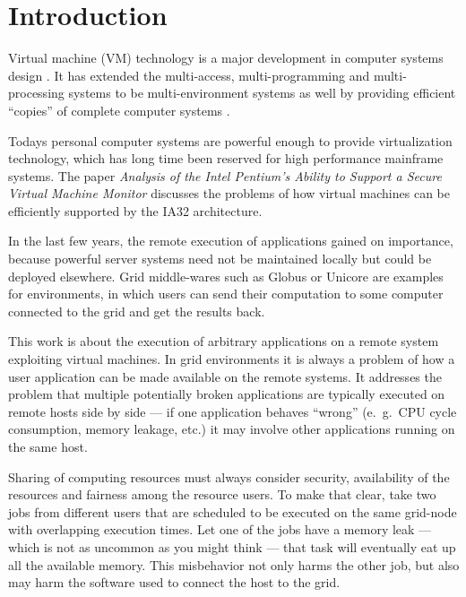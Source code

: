 
\chapter{Introduction}
\label{cha:intro}

Virtual machine (VM) technology is a major development in computer systems
design    \cite{buzen73}.     It    has   extended    the    multi-access,
multi-programming  and multi-processing  systems  to be  multi-environment
systems  as well by  providing efficient  ``copies'' of  complete computer
systems \cite{goldberg73}.

Todays  personal   computer  systems   are  powerful  enough   to  provide
virtualization  technology, which  has long  time been  reserved  for high
performance  mainframe  systems. The  paper  \emph{Analysis  of the  Intel
  Pentium's    Ability    to   Support    a    Secure   Virtual    Machine
  Monitor}\cite{robin00analysis}  discusses the  problems  of how  virtual
machines can be efficiently supported by the IA32 architecture.

In  the last few  years, the  remote execution  of applications  gained on
importance, because powerful server systems need not be maintained locally
but  could be  deployed elsewhere.  Grid  middle-wares such  as Globus  or
Unicore  are examples  for environments,  in  which users  can send  their
computation to  some computer  connected to the  grid and get  the results
back.

This work  is about  the execution of  arbitrary applications on  a remote
system exploiting  virtual machines. In  grid environments it is  always a
problem of  how a  user application  can be made  available on  the remote
systems.  It  addresses  the  problem  that  multiple  potentially  broken
applications are  typically executed on remote  hosts side by  side --- if
one  application behaves  ``wrong'' (e.~g.~CPU  cycle  consumption, memory
leakage,  etc.)  it  may involve  other applications  running on  the same
host.

Sharing of computing resources must always consider security, availability
of  the resources and  fairness among  the resource  users.  To  make that
clear,  take  two jobs  from  different users  that  are  scheduled to  be
executed on the  same grid-node with overlapping execution  times. Let one
of the jobs have  a memory leak --- which is not  as uncommon as you might
think --- that task will eventually  eat up all the available memory. This
misbehavior not only  harms the other job, but also  may harm the software
used to connect the host to the grid.

